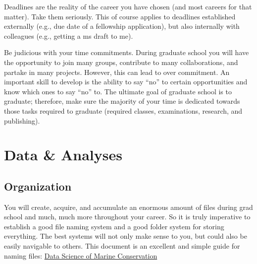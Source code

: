 \documentclass[
]{article}
\begin{document}
Deadlines are the reality of the career you have chosen (and most careers for that matter). Take them seriously. This of course applies to deadlines established externally (e.g., due date of a fellowship application), but also internally with colleagues (e.g., getting a ms draft to me).

Be judicious with your time commitments. During graduate school you will have the opportunity to join many groups, contribute to many collaborations, and partake in many projects. However, this can lead to over commitment. An important skill to develop is the ability to say ``no'' to certain opportunities and know which ones to say ``no'' to. The ultimate goal of graduate school is to graduate; therefore, make sure the majority of your time is dedicated towards those tasks required to graduate (required classes, examinations, research, and publishing).

\hypertarget{data-analyses}{%
\section{\texorpdfstring{\textbf{Data \& Analyses}}{Data \& Analyses}}\label{data-analyses}}

\hypertarget{organization}{%
\subsection{Organization}\label{organization}}

You will create, acquire, and accumulate an enormous amount of files during grad school and much, much more throughout your career. So it is truly imperative to establish a good file naming system and a good folder system for storing everything. The best systems will not only make sense to you, but could also be easily navigable to others. This document is an excellent and simple guide for naming files: \href{https://docs.google.com/presentation/d/1NqfzjMlilJzXKUujFkzSr7xc1eKlDj5TVy02Zg8opwg/present?slide=id.p}{Data Science of Marine Conservation}
\end{document}
